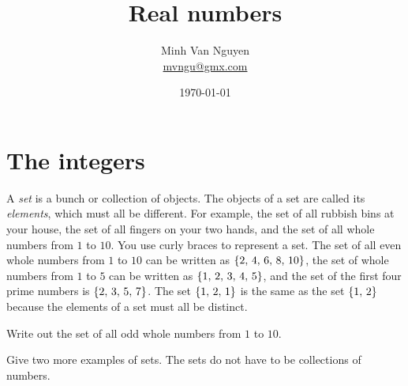 \documentclass[a4paper,oneside,12pt]{article}
\begin{document}
\title{\Large\bf Real numbers}
\author{%
  Minh Van Nguyen \\
  \url{mvngu@gmx.com}
}
\date{\today}
\maketitle



\section{The integers}

A \emph{set} is a bunch or collection of objects.  The objects of a
set are called its \emph{elements}, which must all be different.  For
example, the set of all rubbish bins at your house, the set of all
fingers on your two hands, and the set of all whole numbers from $1$
to $10$.  You use curly braces to represent a set.  The set of all
even whole numbers from $1$ to $10$ can be written as
$\left\lbrace{2},\, {4},\, {6},\, {8},\, {10}\right\rbrace$, the set of whole numbers from $1$
to $5$ can be written as $\left\lbrace{1},\, {2},\, {3},\, {4},\, {5}\right\rbrace$, and the
set of the first four prime numbers is $\left\lbrace{2},\, {3},\, {5},\, {7}\right\rbrace$.
The set $\left\lbrace{1},\, {2},\, {1}\right\rbrace$ is the same as the set
$\left\lbrace{1},\, {2}\right\rbrace$ because the elements of a set must all be
distinct.

\begin{exercise}
Write out the set of all odd whole numbers from $1$ to $10$.
\end{exercise}


\begin{exercise}
Give two more examples of sets.  The sets do not have to be
collections of numbers.
\end{exercise}

\end{document}
